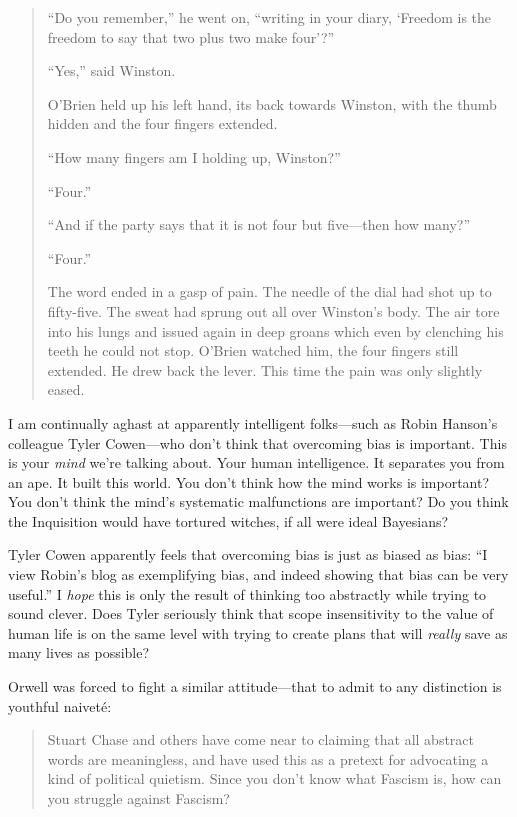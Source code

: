 \begin{quotation}
{
 ``Do you remember,'' he went
on, ``writing in your diary, `Freedom
is the freedom to say that two plus two make
four'?''}

{
 ``Yes,'' said Winston.}

{
 O'Brien held up his left hand, its back towards
Winston, with the thumb hidden and the four fingers extended.}

{
 ``How many fingers am I holding up,
Winston?''}

{
 ``Four.''}

{
 ``And if the party says that it is not four but
five---then how many?''}

{
 ``Four.''}

{
 The word ended in a gasp of pain. The needle of the dial had shot
up to fifty-five. The sweat had sprung out all over
Winston's body. The air tore into his lungs and issued
again in deep groans which even by clenching his teeth he could not
stop. O'Brien watched him, the four fingers still
extended. He drew back the lever. This time the pain was only slightly
eased.}
\end{quotation}

{
 I am continually aghast at apparently intelligent folks---such as
Robin Hanson's colleague Tyler Cowen{}---who
don't think that overcoming bias is important. This is
your \textit{mind} we're talking about. Your human
intelligence. It separates you from an ape. It built this world. You
don't think how the mind works is important? You
don't think the mind's systematic
malfunctions are important? Do you think the Inquisition would have
tortured witches, if all were ideal Bayesians?}

{
 Tyler Cowen apparently feels that overcoming bias is just as
biased as bias: ``I view Robin's blog
as exemplifying bias, and indeed showing that bias can be very
useful.'' I \textit{hope} this is only the result of
thinking too abstractly while trying to sound clever. Does Tyler
seriously think that scope insensitivity to the value of human life is
on the same level with trying to create plans that will \textit{really}
save as many lives as possible?}

{
 Orwell was forced to fight a similar attitude---that to admit to
any distinction is youthful naiveté:}

\begin{quote}
{
 Stuart Chase and others have come near to claiming that all
abstract words are meaningless, and have used this as a pretext for
advocating a kind of political quietism. Since you
don't know what Fascism is, how can you struggle
against Fascism?}
\end{quote}

